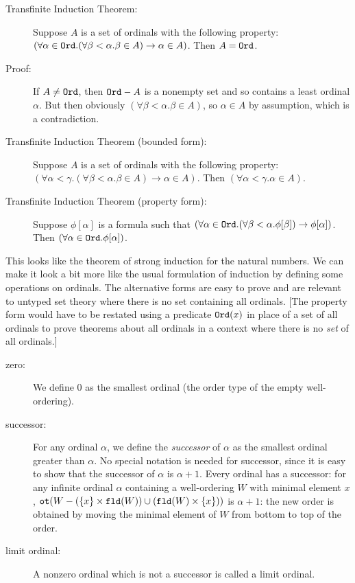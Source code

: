 \documentclass[12pt]{book}
\begin{document}
\begin{description}

\item[Transfinite Induction Theorem:] Suppose $A$ is a set of ordinals
with the following property: $(\forall \alpha \in {\tt Ord}.(\forall
\beta<\alpha.\beta \in A) \rightarrow \alpha \in A)$.  Then $A = {\tt
Ord}$.

\item[Proof:] If $A \neq {\tt Ord}$, then ${\tt Ord}-A$ is a nonempty
set and so contains a least ordinal $\alpha$.  But then obviously
$(\forall \beta<\alpha.\beta \in A)$, so $\alpha \in A$ by assumption,
which is a contradiction.

\item[Transfinite Induction Theorem (bounded form):] Suppose $A$ is a
set of ordinals with the following property: $(\forall \alpha < \gamma.(\forall \beta<\alpha.\beta \in A) \rightarrow \alpha \in A)$.
Then $(\forall \alpha<\gamma.\alpha \in A)$.

\item[Transfinite Induction Theorem (property form):] Suppose
$\phi[\alpha]$ is a formula such that $(\forall \alpha \in {\tt
Ord}.(\forall \beta<\alpha.\phi[\beta]) \rightarrow \phi[\alpha])$.
Then $(\forall \alpha \in {\tt Ord}.\phi[\alpha])$.


\end{description}

This looks like the theorem of strong induction for the natural
numbers.  We can make it look a bit more like the usual formulation of
induction by defining some operations on ordinals.  The alternative
forms are easy to prove and are relevant to untyped set theory where
there is no set containing all ordinals.  [The property form would have
to be restated using a predicate ${\tt Ord}(x)$ in place of a set of
all ordinals to prove theorems about all ordinals in a context where
there is no {\em set\/} of all ordinals.]

\begin{description}

\item[zero:] We define 0 as the smallest ordinal (the order type of
the empty well-ordering).

\item[successor:] For any ordinal $\alpha$, we define the {\em
successor\/} of $\alpha$ as the smallest ordinal greater than
$\alpha$.  No special notation is needed for successor, since it is
easy to show that the successor of $\alpha$ is $\alpha+1$.  Every
ordinal has a successor: for any infinite ordinal $\alpha$ containing
a well-ordering $W$ with minimal element $x$, ${\tt ot}(W - (\{x\}\times
{\tt fld}(W))\cup ({\tt fld}(W) \times \{x\}))$ is $\alpha+1$: the new
order is obtained by moving the minimal element of $W$ from bottom to
top of the order.

\item[limit ordinal:] A nonzero ordinal which is not a successor is
called a limit ordinal.

\end{description}
\end{document}
